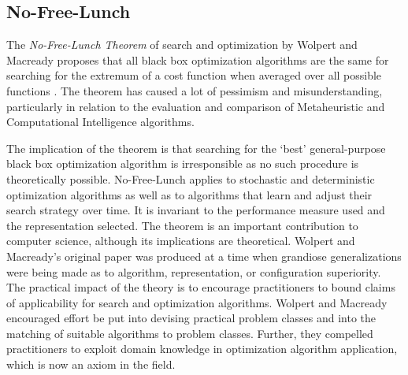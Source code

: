 \begin{bibunit}
% 
% 
\subsection{No-Free-Lunch}
\label{subsec:nfl}
The \emph{No-Free-Lunch Theorem} of search and optimization by Wolpert and Macready proposes that all black box optimization algorithms are the same for searching for the extremum of a cost function when averaged over all possible functions \cite{Wolpert1997, Wolpert1995}. The theorem has caused a lot of pessimism and misunderstanding, particularly in relation to the evaluation and comparison of Metaheuristic and Computational Intelligence algorithms.

The implication of the theorem is that searching for the `best' general-purpose black box optimization algorithm is irresponsible as no such procedure is theoretically possible. No-Free-Lunch applies to stochastic and deterministic optimization algorithms as well as to algorithms that learn and adjust their search strategy over time. It is invariant to the performance measure used and the representation selected. 
The theorem is an important contribution to computer science, although its implications are theoretical. Wolpert and Macready's original paper was produced at a time when grandiose generalizations were being made as to algorithm, representation, or configuration superiority. The practical impact of the theory is to encourage practitioners to bound claims of applicability for search and optimization algorithms. Wolpert and Macready encouraged effort be put into devising practical problem classes and into the matching of suitable algorithms to problem classes. Further, they compelled practitioners to exploit domain knowledge in optimization algorithm application, which is now an axiom in the field.

% 
% 

\end{bibunit}
